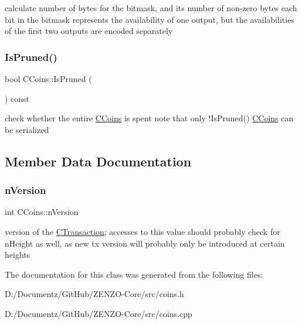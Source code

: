 calculate number of bytes for the bitmask, and its number of non-\/zero bytes each bit in the bitmask represents the availability of one output, but the availabilities of the first two outputs are encoded separately \mbox{\label{class_c_coins_a597a7cb8830fc29565918ce1823b2244}} 
\subsubsection{\texorpdfstring{IsPruned()}{IsPruned()}}
{\footnotesize\ttfamily bool C\+Coins\+::\+Is\+Pruned (\begin{DoxyParamCaption}{ }\end{DoxyParamCaption}) const\hspace{0.3cm}{\ttfamily [inline]}}

check whether the entire \mbox{\hyperlink{class_c_coins}{C\+Coins}} is spent note that only !\+Is\+Pruned() \mbox{\hyperlink{class_c_coins}{C\+Coins}} can be serialized 

\subsection{Member Data Documentation}
\mbox{\label{class_c_coins_a96fea4ee8841e9ce32f60c2e7e3cf6b6}} 
\subsubsection{\texorpdfstring{nVersion}{nVersion}}
{\footnotesize\ttfamily int C\+Coins\+::n\+Version}

version of the \mbox{\hyperlink{class_c_transaction}{C\+Transaction}}; accesses to this value should probably check for n\+Height as well, as new tx version will probably only be introduced at certain heights 

The documentation for this class was generated from the following files\+:\begin{DoxyCompactItemize}
\item 
D\+:/\+Documentz/\+Git\+Hub/\+Z\+E\+N\+Z\+O-\/\+Core/src/coins.\+h\item 
D\+:/\+Documentz/\+Git\+Hub/\+Z\+E\+N\+Z\+O-\/\+Core/src/coins.\+cpp\end{DoxyCompactItemize}
